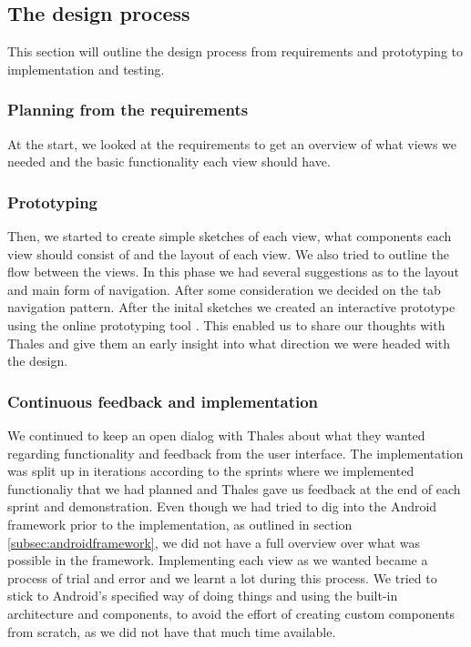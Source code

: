\subsection{The design process}
This section will outline the design process from requirements and prototyping to implementation and testing.

\subsubsection{Planning from the requirements}
At the start, we looked at the requirements to get an overview of what views we needed and the basic functionality each view should have. 

\pagebreak

\subsubsection{Prototyping}
Then, we started to create simple sketches of each view, what components each view should consist of and the layout of each view. We also tried to outline the flow between the views. In this phase we had several suggestions as to the layout and main form of navigation. After some consideration we decided on the tab navigation pattern.
\newline
\newline
After the inital sketches we created an interactive prototype using the online prototyping tool \cite{bib:fui}. This enabled us to share our thoughts with Thales and give them an early insight into what direction we were headed with the design.

\subsubsection{Continuous feedback and implementation}
We continued to keep an open dialog with Thales about what they wanted regarding functionality and feedback from the user interface. The implementation was split up in iterations according to the sprints where we implemented functionaliy that we had planned and Thales gave us feedback at the end of each sprint and demonstration. 
\newline
\newline
Even though we had tried to dig into the Android framework prior to the implementation, as outlined in section \ref{subsec:androidframework}, we did not have a full overview over what was possible in the framework. Implementing each view as we wanted became a process of trial and error and we learnt a lot during this process. We tried to stick to Android's specified way of doing things and using the built-in architecture and components, to avoid the effort of creating custom components from scratch, as we did not have that much time available. 

